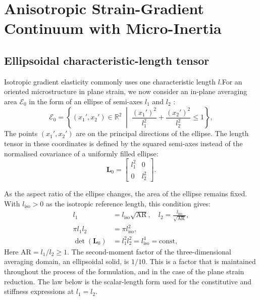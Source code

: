 \section{Anisotropic Strain-Gradient Continuum with Micro-Inertia}
\label{sec:continuum}

\subsection{Ellipsoidal characteristic-length tensor}
Isotropic gradient elasticity commonly uses one characteristic length $l$.For an oriented microstructure in plane strain, we now consider an in-plane averaging area $\mathcal{E}_0$ in the form of an ellipse of semi-axes $l_1$ and $l_2$ :
\begin{equation}
\mathcal{E}_0 = \left\{ (x_1', x_2') \in \mathbb{R}^2 \;\middle|\; \frac{(x_1')^2}{l_1^2} + \frac{(x_2')^2}{l_2^2} \le 1 \right\},
\label{eq:ellipse_def}
\end{equation}
The points $(x_1',x_2')$ are on the principal directions of the ellipse. The length tensor in these coordinates is defined by the squared semi-axes instead of the normalised covariance of a uniformly filled ellipse:
\begin{equation}
\mathbf{L}_0 = \begin{bmatrix} l_1^2 & 0 \\ 0 & l_2^2 \end{bmatrix}.
\label{eq:L0_mat}
\end{equation}

As the aspect ratio of the ellipse changes, the area of the ellipse remains fixed. With $l_{\mathrm{iso}}>0$ as the isotropic reference length, this condition gives:
\begin{equation}
\begin{split}
l_1 &= l_{\mathrm{iso}}\sqrt{\mathrm{AR}}, \quad l_2 = \frac{l_{\mathrm{iso}}}{\sqrt{\mathrm{AR}}}, \\
\pi l_1l_2 &= \pi l_{\mathrm{iso}}^2, \\
\det(\mathbf{L}_0) &= l_1^2l_2^2 = l_{\mathrm{iso}}^4 = \mathrm{const},
\end{split}
\label{eq:volume_equivalent}
\end{equation}
Here $\mathrm{AR}=l_1/l_2\ge1$. The second-moment factor of the three-dimensional averaging domain, an ellipsoidal solid, is $1/10$. This is a factor that is maintained throughout the process of the formulation, and in the case of the plane strain reduction. The law below is the scalar-length form used for the constitutive and stiffness expressions at $l_1=l_2$.

